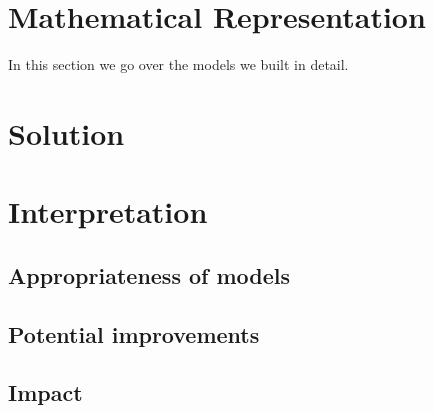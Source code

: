 \documentclass[11pt]{amsart}
\begin{document}
\section{Mathematical Representation}

\par In this section we go over the models we built in detail.

\section{Solution}

\cite{modeling_yeast_spread}

\section{Interpretation}


\subsection*{Appropriateness of models}


\subsection*{Potential improvements}


\subsection*{Impact}


\FloatBarrier %
\newpage


\end{document}
